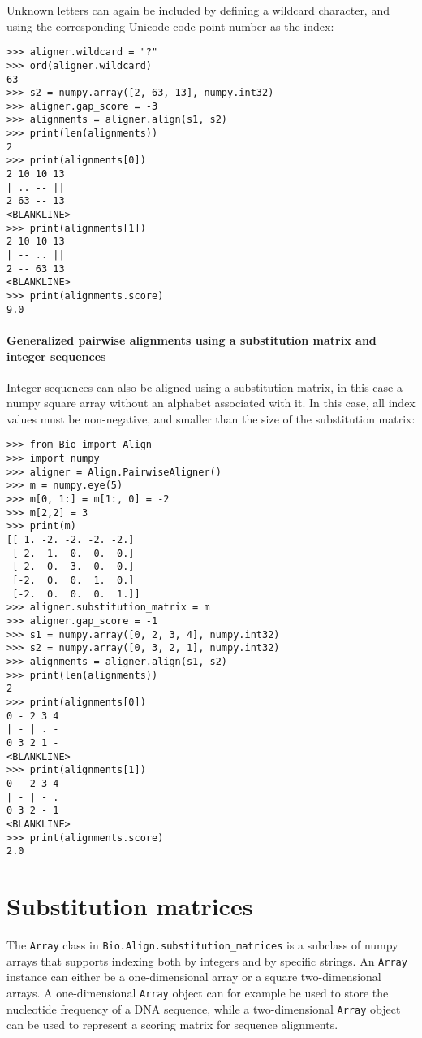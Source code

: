 Unknown letters can again be included by defining a wildcard character, and using the corresponding Unicode code point number as the index:

\begin{verbatim}
>>> aligner.wildcard = "?"
>>> ord(aligner.wildcard)
63
>>> s2 = numpy.array([2, 63, 13], numpy.int32)
>>> aligner.gap_score = -3
>>> alignments = aligner.align(s1, s2)
>>> print(len(alignments))
2
>>> print(alignments[0])
2 10 10 13
| .. -- ||
2 63 -- 13
<BLANKLINE>
>>> print(alignments[1])
2 10 10 13
| -- .. ||
2 -- 63 13
<BLANKLINE>
>>> print(alignments.score)
9.0
\end{verbatim}

\paragraph*{Generalized pairwise alignments using a substitution matrix and integer sequences}

Integer sequences can also be aligned using a substitution matrix, in this case a numpy square array without an alphabet associated with it. In this case, all index values must be non-negative, and smaller than the size of the substitution matrix:

\begin{verbatim}
>>> from Bio import Align
>>> import numpy
>>> aligner = Align.PairwiseAligner()
>>> m = numpy.eye(5)
>>> m[0, 1:] = m[1:, 0] = -2
>>> m[2,2] = 3
>>> print(m)
[[ 1. -2. -2. -2. -2.]
 [-2.  1.  0.  0.  0.]
 [-2.  0.  3.  0.  0.]
 [-2.  0.  0.  1.  0.]
 [-2.  0.  0.  0.  1.]]
>>> aligner.substitution_matrix = m
>>> aligner.gap_score = -1
>>> s1 = numpy.array([0, 2, 3, 4], numpy.int32)
>>> s2 = numpy.array([0, 3, 2, 1], numpy.int32)
>>> alignments = aligner.align(s1, s2)
>>> print(len(alignments))
2
>>> print(alignments[0])
0 - 2 3 4
| - | . -
0 3 2 1 -
<BLANKLINE>
>>> print(alignments[1])
0 - 2 3 4
| - | - .
0 3 2 - 1
<BLANKLINE>
>>> print(alignments.score)
2.0
\end{verbatim}

\section{Substitution matrices}
\label{sec:substitution_matrices}

The \verb+Array+ class in \verb+Bio.Align.substitution_matrices+ is a subclass of numpy arrays that supports indexing both by integers and by specific strings. An \verb+Array+ instance can either be a one-dimensional array or a square two-dimensional arrays. A one-dimensional \verb+Array+ object can for example be used to store the nucleotide frequency of a DNA sequence, while a two-dimensional \verb+Array+ object can be used to represent a scoring matrix for sequence alignments.

